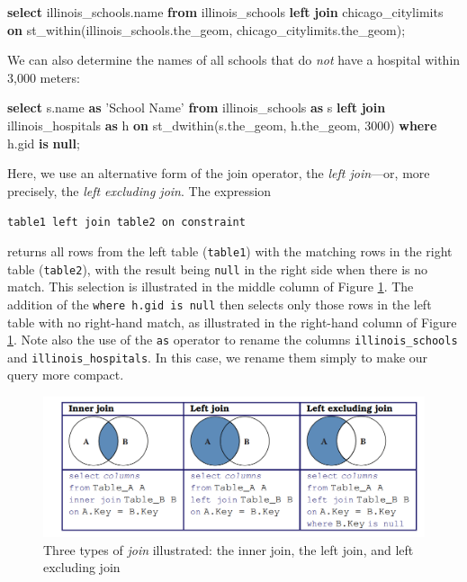 \documentclass[]{krantz}
\newenvironment{Shaded}{\begin{snugshade}}{\end{snugshade}}
\newcommand{\KeywordTok}[1]{\textcolor[rgb]{0.13,0.29,0.53}{\textbf{#1}}}
\newcommand{\DecValTok}[1]{\textcolor[rgb]{0.00,0.00,0.81}{#1}}
\newcommand{\StringTok}[1]{\textcolor[rgb]{0.31,0.60,0.02}{#1}}
\newcommand{\NormalTok}[1]{#1}
\begin{document}
\begin{Shaded}
\begin{Highlighting}[]
\KeywordTok{select}\NormalTok{ illinois_schools.name}
  \KeywordTok{from}\NormalTok{ illinois_schools }\KeywordTok{left} \KeywordTok{join}\NormalTok{ chicago_citylimits}
  \KeywordTok{on}\NormalTok{ st_within(illinois_schools.the_geom,}
\NormalTok{                  chicago_citylimits.the_geom);}
\end{Highlighting}
\end{Shaded}

We can also determine the names of all schools that do \emph{not} have a
hospital within 3,000 meters:

\begin{Shaded}
\begin{Highlighting}[]
\KeywordTok{select}\NormalTok{ s.name }\KeywordTok{as} \StringTok{'School Name'}
    \KeywordTok{from}\NormalTok{ illinois_schools }\KeywordTok{as}\NormalTok{ s}
        \KeywordTok{left} \KeywordTok{join}\NormalTok{ illinois_hospitals }\KeywordTok{as}\NormalTok{ h}
          \KeywordTok{on}\NormalTok{ st_dwithin(s.the_geom, h.the_geom, }\DecValTok{3000}\NormalTok{)}
    \KeywordTok{where}\NormalTok{ h.gid }\KeywordTok{is} \KeywordTok{null}\NormalTok{;}
\end{Highlighting}
\end{Shaded}

Here, we use an alternative form of the join operator, the \emph{left
join}---or, more precisely, the \emph{left excluding join}. The
expression

\texttt{table1\ left\ join\ table2\ on\ constraint}

returns all rows from the left table (\texttt{table1}) with the matching
rows in the right table (\texttt{table2}), with the result being
\texttt{null} in the right side when there is no match. This selection
is illustrated in the middle column of Figure \ref{fig:fig-venn}. The
addition of the \texttt{where\ h.gid\ is\ null} then selects only those
rows in the left table with no right-hand match, as illustrated in the
right-hand column of Figure \ref{fig:fig-venn}. Note also the use of the
\texttt{as} operator to rename the columns \texttt{illinois\_schools}
and \texttt{illinois\_hospitals}. In this case, we rename them simply to
make our query more compact.

\begin{figure}

{\centering \includegraphics[width=0.7\linewidth]{ChapterDB/figures/fig-venn} 

}

\caption{Three types of \textit{join} illustrated: the inner join, the left join, and left excluding join}\label{fig:fig-venn}
\end{figure}
\end{document}
